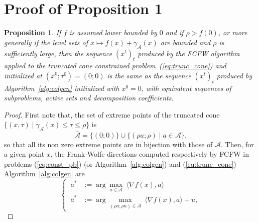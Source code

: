 \documentclass[twoside]{article}
\def\A{\mathcal{A}}
\newcommand{\dt}[2]{\langle#1,#2\rangle}
\newtheorem{prop}{Proposition}
\begin{document}
\appendix
\section{Proof of Proposition 1}
\begin{prop}
If $f$ is assumed lower bounded by $0$ and if $\rho>f(0)$, or more generally if the level sets of $x \mapsto f(x)+\gamma_{\A}(x)$ are bounded and $\rho$ is sufficiently large, then the sequence $(\bar{x}^t)_t$ produced by the FCFW algorithm applied to the truncated cone constrained problem~(\ref{eq:trunc_cone}) and initialized at $(\bar{x}^0;\tau^0)=(0;0)$ is the same as the sequence $(x^t)_t$ produced by Algorithm~\ref{alg:colgen} initialized with $x^0=0$, with equivalent sequences of subproblems, active sets and decomposition coefficients.
\end{prop}
\begin{proof}
 First note that, the set of extreme points of the truncated cone $\{(x,\tau) \mid \gamma_{\A}(x) \leq \tau \leq \rho\}$ is $$\bar{\A}=\{(0;0)\} \cup \big \{(\rho a; \rho) \mid a \in \A \big \}.$$ so that all its non zero extreme points are in bijection with those of $\A$.
Then, for a given point $x$, the Frank-Wolfe directions computed respectively by FCFW in problems (\ref{eq:const_pb}) (or Algorithm~\ref{alg:colgen}) and (\ref{eq:trunc_cone}) Algorithm~\ref{alg:colgen}  are
$$
\begin{cases}
\: a^* &:=\arg\max_{a \in \A} \: \dt{\nabla f(x)}{a}\\
\: \bar{a}^* &:=\arg\max_{(\rho a;\rho u) \in \bar{\A}}\: \dt{\nabla f(x)}{a}+u,
\end{cases}
$$


\end{proof}
\end{document}
